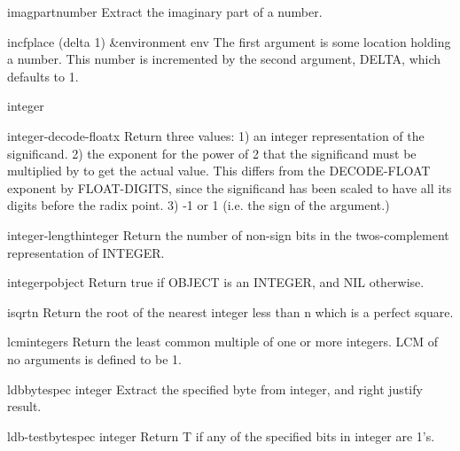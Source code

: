 \begin{function}{imagpart}{number}{}
  Extract the imaginary part of a number.
\end{function}

\begin{macro}{incf}{place \op (delta 1) &environment env}{}
  The first argument is some location holding a number. This number is
  incremented by the second argument, DELTA, which defaults to 1.
\end{macro}

\begin{class}{integer}{}{}
  
\end{class}

\begin{function}{integer-decode-float}{x}{}
  Return three values:
   1) an integer representation of the significand.
   2) the exponent for the power of 2 that the significand must be multiplied
      by to get the actual value. This differs from the DECODE-FLOAT exponent
      by FLOAT-DIGITS, since the significand has been scaled to have all its
      digits before the radix point.
   3) -1 or 1 (i.e. the sign of the argument.)
\end{function}

\begin{function}{integer-length}{integer}{}
  Return the number of non-sign bits in the twos-complement representation
  of INTEGER.
\end{function}

\begin{function}{integerp}{object}{}
  Return true if OBJECT is an INTEGER, and NIL otherwise.
\end{function}

\begin{function}{isqrt}{n}{}
  Return the root of the nearest integer less than n which is a perfect
   square.
\end{function}

\begin{function}{lcm}{\rest integers}{}
  Return the least common multiple of one or more integers. LCM of no
  arguments is defined to be 1.
\end{function}

\begin{accessor}{ldb}{bytespec integer}{}
  Extract the specified byte from integer, and right justify result.
\end{accessor}

\begin{function}{ldb-test}{bytespec integer}{}
  Return T if any of the specified bits in integer are 1's.
\end{function}

